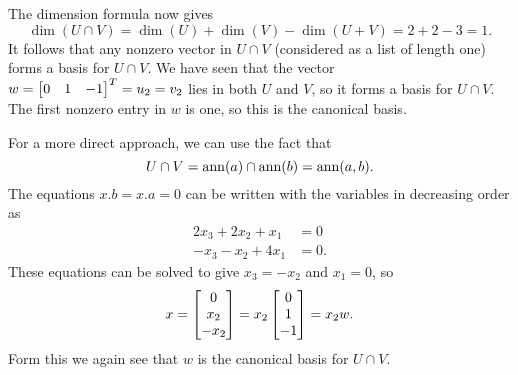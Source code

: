 \documentclass[a4paper]{amsart}
\renewenvironment{solution}{\SolutionInline}{\endSolutionInline}
\begin{document}
\begin{solution}
 The dimension formula now gives
 \[ \dim(U\cap V) = \dim(U)+\dim(V)-\dim(U+V) = 2+2-3 = 1. \]
 It follows that any nonzero vector in $U\cap V$ (considered as a list
 of length one) forms a basis for $U\cap V$.  We have seen that the
 vector $w=\left[\begin{matrix} 0&1&-1\end{matrix}\right]^T=u_2=v_2$ lies in both $U$ and $V$, so it
 forms a basis for $U\cap V$.  The first nonzero entry in $w$ is one,
 so this is the canonical basis.

 For a more direct approach, we can use the fact that 
 \[ U\cap V = \operatorname{ann}(a)\cap\operatorname{ann}(b) = \operatorname{ann}(a,b). \]
 The equations $x.b=x.a=0$ can be written with the variables in
 decreasing order as
 \begin{align*}
  2x_3+2x_2+x_1 &= 0 \\
  -x_3-x_2+4x_1 &= 0.
 \end{align*}
 These equations can be solved to give $x_3=-x_2$ and $x_1=0$, so
 \[ x = \left[\begin{matrix} 0 \\ x_2 \\ -x_2 \end{matrix}\right] =
      x_2 \left[\begin{matrix} 0 \\ 1 \\ -1 \end{matrix}\right] = x_2w.
 \]
 Form this we again see that $w$ is the canonical basis for $U\cap V$.
\end{solution}
\end{document}
